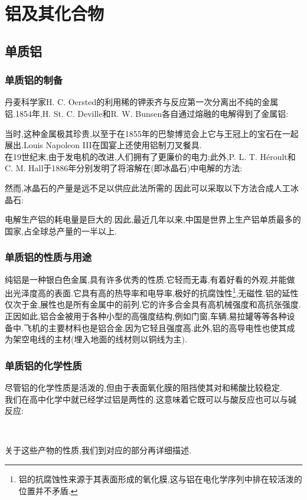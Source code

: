 \documentclass{ctexart}
\begin{document}
\section{铝及其化合物}
\subsection{单质铝}
\subsubsection{单质铝的制备}
丹麦科学家H. C. Oersted的利用稀的钾汞齐与反应第一次分离出不纯的金属铝.1854年,H. St. C. Deville和R. W. Bunsen各自通过熔融的电解得到了金属铝:
\begin{center}
\end{center}

\indent 当时,这种金属极其珍贵,以至于在1855年的巴黎博览会上它与王冠上的宝石在一起展出.Louis Napoleon III在国宴上还使用铝制刀叉餐具.\\
\indent 在19世纪末,由于发电机的改进,人们拥有了更廉价的电力;此外,P. L. T. Héroult和C. M. Hall于1886年分别发明了将溶解在(即冰晶石)中电解的方法:
\begin{center}
\end{center}
然而,冰晶石的产量是远不足以供应此法所需的.因此可以采取以下方法合成人工冰晶石:
\begin{center}
\end{center}
电解生产铝的耗电量是巨大的.因此,最近几年以来,中国是世界上生产铝单质最多的国家,占全球总产量的一半以上.
\subsubsection{单质铝的性质与用途}
纯铝是一种银白色金属,具有许多优秀的性质.它轻而无毒,有着好看的外观,并能做出光泽度高的表面.它具有高的热导率和电导率,极好的抗腐蚀性\footnote{铝的抗腐蚀性来源于其表面形成的氧化膜,这与铝在电化学序列中排在较活泼的位置并不矛盾.},无磁性.铝的延性仅次于金,展性也是所有金属中的前列.它的许多合金具有高机械强度和高抗张强度.\\
\indent 正因如此,铝合金被用于各种小型的高强度结构,例如门窗,车辆,易拉罐等等各种设备中.飞机的主要材料也是铝合金,因为它轻且强度高.此外,铝的高导电性也使其成为架空电线的主材(埋入地面的线材则以铜线为主).
\subsubsection{单质铝的化学性质}
尽管铝的化学性质是活泼的,但由于表面氧化膜的阻挡使其对和稀酸比较稳定.\\
\indent 我们在高中化学中就已经学过铝是两性的.这意味着它既可以与酸反应也可以与碱反应:
\begin{center}
    \\
\end{center}
关于这些产物的性质,我们到对应的部分再详细描述.
\end{document}
